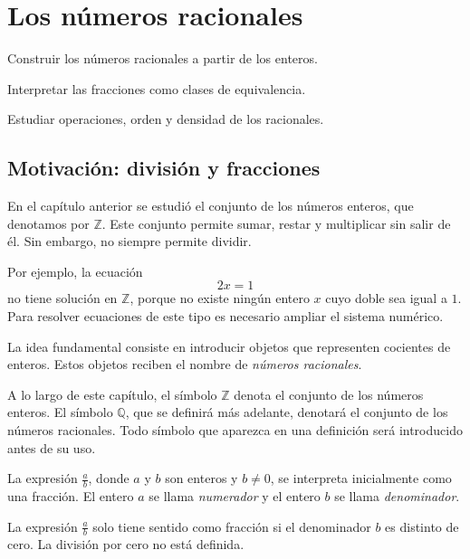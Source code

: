 \chapter{Los números racionales}

\begin{objetivos}
  \item Construir los números racionales a partir de los enteros.
  \item Interpretar las fracciones como clases de equivalencia.
  \item Estudiar operaciones, orden y densidad de los racionales.
\end{objetivos}

\section{Motivación: división y fracciones}

En el capítulo anterior se estudió el conjunto de los números enteros, que denotamos por \(\mathbb{Z}\). Este conjunto permite sumar, restar y multiplicar sin salir de él. Sin embargo, no siempre permite dividir.

Por ejemplo, la ecuación
\[
  2x=1
\]
no tiene solución en \(\mathbb{Z}\), porque no existe ningún entero \(x\) cuyo doble sea igual a \(1\). Para resolver ecuaciones de este tipo es necesario ampliar el sistema numérico.

La idea fundamental consiste en introducir objetos que representen cocientes de enteros. Estos objetos reciben el nombre de \emph{números racionales}.

\begin{convencion}
A lo largo de este capítulo, el símbolo \(\mathbb{Z}\) denota el conjunto de los números enteros. El símbolo \(\mathbb{Q}\), que se definirá más adelante, denotará el conjunto de los números racionales. Todo símbolo que aparezca en una definición será introducido antes de su uso.
\end{convencion}

La expresión \(\frac{a}{b}\), donde \(a\) y \(b\) son enteros y \(b\neq 0\), se interpreta inicialmente como una fracción. El entero \(a\) se llama \emph{numerador} y el entero \(b\) se llama \emph{denominador}.

\begin{advertencia}
La expresión \(\frac{a}{b}\) solo tiene sentido como fracción si el denominador \(b\) es distinto de cero. La división por cero no está definida.
\end{advertencia}

